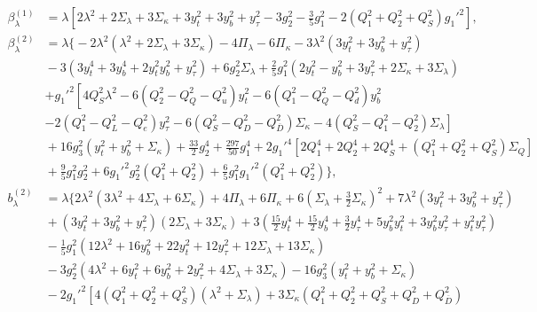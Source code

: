 \documentclass[preprint,amsmath,amssymb,aps,superscriptaddress,prd,showpacs,floatfix,nofootinbib]{revtex4-1}
\begin{document}
\begin{subequations}\label{eq:USSMLambdaBetas}
\begin{align}
\beta_\lambda^{(1)}&=\lambda  \left[2\lambda ^2+2 \Sigma_\lambda +3 \Sigma_\kappa +3 y_t^2+3 y_b^2+y_{\tau }^2-3 g_2^2-\frac{3}{5} g_1^2 -2 \left ( Q_1^2 + Q_2^2 + Q_S^2\right )g_1'^2 \right],\label{eq:USSMLambdaBetaOneLoop}\\
\beta_\lambda^{(2)}&=\lambda \bigg \{ -2\lambda^2\left ( \lambda^2+2\Sigma_\lambda+3\Sigma_\kappa\right )-4\Pi_\lambda-6\Pi_\kappa-3\lambda^2\left ( 3y_t^2+3y_b^2+y_\tau^2\right ) \nonumber\\
&{} -3\left ( 3y_t^4+3y_b^4+2y_t^2y_b^2+y_\tau^2 \right )+6g_2^2\Sigma_\lambda+\frac{2}{5}g_1^2\left ( 2y_t^2-y_b^2+3y_\tau^2+2\Sigma_\kappa +3\Sigma_\lambda\right )\nonumber\\
&{}\left.+g_1'^2\left [ 4Q_S^2\lambda^2 -6\left ( Q_2^2-Q_Q^2-Q_u^2\right )y_t^2-6\left ( Q_1^2-Q_Q^2-Q_d^2\right )y_b^2 \right.\right.\nonumber\\
&{}\left.-2\left ( Q_1^2-Q_L^2-Q_e^2\right )y_\tau^2-6\left ( Q_S^2-Q_D^2-Q_{\overline{D}}^2 \right )\Sigma_\kappa-4\left ( Q_S^2-Q_1^2-Q_2^2\right )\Sigma_\lambda\right ]\nonumber\\
&{}+16g_3^2\left ( y_t^2+y_b^2+\Sigma_\kappa\right ) +\frac{33}{2}g_2^4+\frac{297}{50}g_1^4+2g_1'^4\left [ 2Q_1^4+2Q_2^4+2Q_S^4+\left ( Q_1^2+Q_2^2+Q_S^2\right )\Sigma_{Q}\right ]\nonumber\\
&{}+\frac{9}{5}g_1^2g_2^2+6g_1'^2g_2^2\left ( Q_1^2+Q_2^2\right )+\frac{6}{5}g_1^2g_1'^2\left (Q_1^2+Q_2^2\right )\bigg \},\label{eq:USSMLambdaBetaTwoLoop}\\
b_\lambda^{(2)}&=\lambda \bigg \{ 2\lambda^2\left ( 3\lambda^2 +4\Sigma_\lambda +6\Sigma_\kappa \right )+4\Pi_\lambda + 6\Pi_\kappa +6\left ( \Sigma_\lambda+\frac{3}{2}\Sigma_\kappa\right )^2+7\lambda^2\left ( 3y_t^2+3y_b^2+y_\tau^2\right )\nonumber\\
&{}+\left ( 3y_t^2+3y_b^2+y_\tau^2\right )\left (2\Sigma_\lambda+3\Sigma_\kappa\right ) +3\left ( \frac{15}{2}y_t^4+\frac{15}{2}y_b^4+\frac{3}{2}y_\tau^4 +5y_b^2y_t^2 +3y_b^2y_\tau^2 +y_t^2y_\tau^2\right )\nonumber\\
&{}-\frac{1}{5}g_1^2\left ( 12\lambda^2+16y_b^2+22y_t^2+12y_\tau^2+12\Sigma_\lambda +13\Sigma_\kappa \right )\nonumber\\
&{}-3g_2^2\left ( 4\lambda^2+6y_t^2+6y_b^2+2y_\tau^2+4\Sigma_\lambda+3\Sigma_\kappa\right )-16g_3^2\left ( y_t^2+y_b^2+\Sigma_\kappa \right )\nonumber\\
&{}-2g_1'^2\left [ 4\left ( Q_1^2+Q_2^2+Q_S^2\right )\left ( \lambda^2 +\Sigma_\lambda \right )+3\Sigma_\kappa\left ( Q_1^2+Q_2^2+Q_S^2+Q_D^2+Q_{\overline{D}}^2\right )\right .\nonumber\\

\end{align}
\end{subequations}
\end{document}
